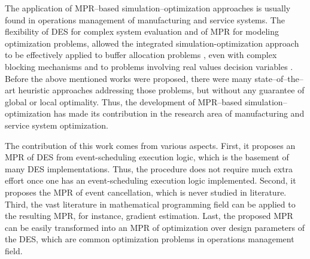 \documentclass[]{interact}
\theoremstyle{plain}%
\theoremstyle{definition}
\theoremstyle{remark}
\begin{document}
The application of MPR--based simulation--optimization approaches is usually found in operations management of manufacturing and service systems. %
The flexibility of DES for complex system evaluation and of MPR for modeling optimization problems, allowed the integrated simulation-optimization approach to be effectively applied to buffer allocation problems \citep{zhang2020BAP}, even with complex blocking mechanisms \citep{pedrielli2015integrated} and to problems involving real values decision variables \citep{tan2015mathematical,zhang2020models}. 
Before the above mentioned works were proposed, there were many state--of--the--art heuristic approaches addressing those problems, but without any guarantee of global or local optimality. Thus, the development of MPR--based simulation--optimization has made its contribution in the research area of manufacturing and service system optimization.


The contribution of this work comes from various aspects. First, it proposes an MPR of DES from event-scheduling execution logic, which is the basement of many DES implementations. Thus, the procedure does not require much extra effort once one has an event-scheduling execution logic implemented. Second, it proposes the MPR of event cancellation, which is never studied in literature. Third, the vast literature in mathematical programming field can be applied to the resulting MPR, for instance, gradient estimation. Last, the proposed MPR can be easily transformed into an MPR of optimization over design parameters of the DES, which are common optimization problems in operations management field.  
\end{document}
